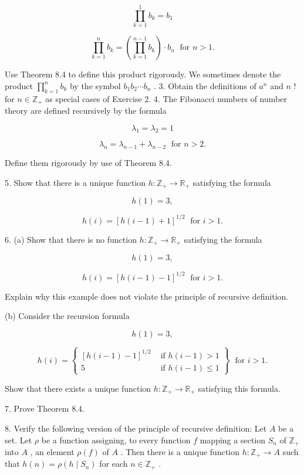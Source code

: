 \begin{theorem}
\[
\mathop{\prod }\limits_{{k = 1}}^{1}{b}_{k} = {b}_{1}
\]

\[
\mathop{\prod }\limits_{{k = 1}}^{n}{b}_{k} = \left( {\mathop{\prod }\limits_{{k = 1}}^{{n - 1}}{b}_{k}}\right)  \cdot  {b}_{n}\;\text{ for }n > 1.
\]

Use Theorem 8.4 to define this product rigorously. We sometimes denote the product \(\mathop{\prod }\limits_{{k = 1}}^{n}{b}_{k}\) by the symbol \({b}_{1}{b}_{2}\cdots {b}_{n}\) . 3. Obtain the definitions of \({a}^{n}\) and \(n\) ! for \(n \in  {\mathbb{Z}}_{ + }\) as special cases of Exercise 2. 4. The Fibonacci numbers of number theory are defined recursively by the formula

\[
{\lambda }_{1} = {\lambda }_{2} = 1
\]

\[
{\lambda }_{n} = {\lambda }_{n - 1} + {\lambda }_{n - 2}\;\text{ for }n > 2.
\]

Define them rigorously by use of Theorem 8.4.

5. Show that there is a unique function \(h : {\mathbb{Z}}_{ + } \rightarrow  {\mathbb{R}}_{ + }\) satisfying the formula

\[
h\left( 1\right)  = 3,
\]

\[
h\left( i\right)  = {\left\lbrack  h\left( i - 1\right)  + 1\right\rbrack  }^{1/2}\;\text{ for }i > 1.
\]

6. (a) Show that there is no function \(h : {\mathbb{Z}}_{ + } \rightarrow  {\mathbb{R}}_{ + }\) satisfying the formula

\[
h\left( 1\right)  = 3,
\]

\[
h\left( i\right)  = {\left\lbrack  h\left( i - 1\right)  - 1\right\rbrack  }^{1/2}\;\text{ for }i > 1.
\]

Explain why this example does not violate the principle of recursive definition.

(b) Consider the recursion formula

\[
h\left( 1\right)  = 3,
\]

\[
h\left( i\right)  = \left\{  \begin{array}{ll} {\left\lbrack  h\left( i - 1\right)  - 1\right\rbrack  }^{1/2} & \text{ if }h\left( {i - 1}\right)  > 1 \\  5 & \text{ if }h\left( {i - 1}\right)  \leq  1 \end{array}\right\}  \;\text{ for }i > 1.
\]

Show that there exists a unique function \(h : {\mathbb{Z}}_{ + } \rightarrow  {\mathbb{R}}_{ + }\) satisfying this formula.

7. Prove Theorem 8.4.

8. Verify the following version of the principle of recursive definition: Let \(A\) be a set. Let \(\rho\) be a function assigning, to every function \(f\) mapping a section \({S}_{n}\) of \({\mathbb{Z}}_{ + }\) into \(A\) , an element \(\rho \left( f\right)\) of \(A\) . Then there is a unique function \(h : {\mathbb{Z}}_{ + } \rightarrow  A\) such that \(h\left( n\right)  = \rho \left( {h \mid  {S}_{n}}\right)\) for each \(n \in  {\mathbb{Z}}_{ + }\) .

\end{theorem}

